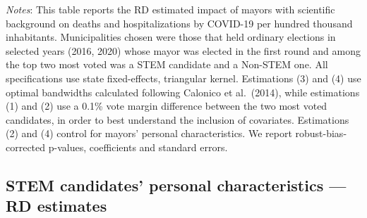 \documentclass[
  letterpaper,
  DIV=11,
  numbers=noendperiod]{scrartcl}
\begin{document}
\emph{Notes}: This table reports the RD estimated impact of mayors with
scientific background on deaths and hospitalizations by COVID-19 per
hundred thousand inhabitants. Municipalities chosen were those that held
ordinary elections in selected years (2016, 2020) whose mayor was
elected in the first round and among the top two most voted was a STEM
candidate and a Non-STEM one. All specifications use state
fixed-effects, triangular kernel. Estimations (3) and (4) use optimal
bandwidths calculated following Calonico et al.~(2014), while
estimations (1) and (2) use a 0.1\% vote margin difference between the
two most voted candidates, in order to best understand the inclusion of
covariates. Estimations (2) and (4) control for mayors' personal
characteristics. We report robust-bias-corrected p-values, coefficients
and standard errors.

\subsection{STEM candidates' personal characteristics --- RD
estimates}\label{stem-candidates-personal-characteristics-rd-estimates}
\end{document}
